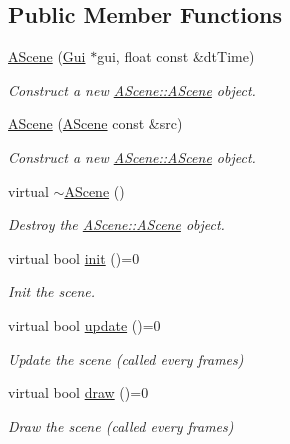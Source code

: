 \subsection*{Public Member Functions}
\begin{DoxyCompactItemize}
\item 
\hyperlink{class_a_scene_a00e7cd759bb0f43141df51c4ab6e6c47}{A\+Scene} (\hyperlink{class_gui}{Gui} $\ast$gui, float const \&dt\+Time)
\begin{DoxyCompactList}\small\item\em Construct a new \hyperlink{class_a_scene_a00e7cd759bb0f43141df51c4ab6e6c47}{A\+Scene\+::\+A\+Scene} object. \end{DoxyCompactList}\item 
\hyperlink{class_a_scene_aa204afecf39bdfcbe83dad3ed8cce34f}{A\+Scene} (\hyperlink{class_a_scene}{A\+Scene} const \&src)
\begin{DoxyCompactList}\small\item\em Construct a new \hyperlink{class_a_scene_a00e7cd759bb0f43141df51c4ab6e6c47}{A\+Scene\+::\+A\+Scene} object. \end{DoxyCompactList}\item 
\mbox{\label{class_a_scene_a9faf7f1a271327227e83627432d0b210}} 
virtual \hyperlink{class_a_scene_a9faf7f1a271327227e83627432d0b210}{$\sim$\+A\+Scene} ()
\begin{DoxyCompactList}\small\item\em Destroy the \hyperlink{class_a_scene_a00e7cd759bb0f43141df51c4ab6e6c47}{A\+Scene\+::\+A\+Scene} object. \end{DoxyCompactList}\item 
virtual bool \hyperlink{class_a_scene_ad431efa9c183182e8b5abb1bb8437a74}{init} ()=0
\begin{DoxyCompactList}\small\item\em Init the scene. \end{DoxyCompactList}\item 
virtual bool \hyperlink{class_a_scene_af3ed61809cc5924b9d5530473576a0c7}{update} ()=0
\begin{DoxyCompactList}\small\item\em Update the scene (called every frames) \end{DoxyCompactList}\item 
virtual bool \hyperlink{class_a_scene_a7c303489d4c296482af38aa5deccbd8b}{draw} ()=0
\begin{DoxyCompactList}\small\item\em Draw the scene (called every frames) \end{DoxyCompactList}\item 

\end{DoxyCompactItemize}
